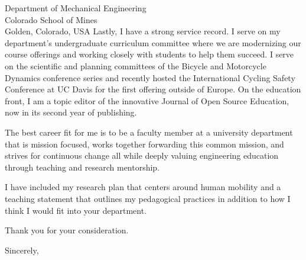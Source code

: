 \documentclass{letter}
\begin{document}
\begin{letter}{
    Department of Mechanical Engineering \\
    Colorado School of Mines \\
    Golden, Colorado, USA
}
Lastly, I have a strong service record. I serve on my department's
undergraduate curriculum committee where we are modernizing our course
offerings and working closely with students to help them succeed. I serve on
the scientific and planning committees of the Bicycle and Motorcycle Dynamics
conference series and recently hosted the International Cycling Safety
Conference at UC Davis for the first offering outside of Europe. On the
education front, I am a topic editor of the innovative Journal of Open Source
Education, now in its second year of publishing.

The best career fit for me is to be a faculty member at a university department
that is mission focused, works together forwarding this common mission, and
strives for continuous change all while deeply valuing engineering education
through teaching and research mentorship.

I have included my research plan that centers around human mobility and a
teaching statement that outlines my pedagogical practices in addition to how I
think I would fit into your department.

Thank you for your consideration.

\closing{Sincerely,}

\end{letter}
\end{document}
